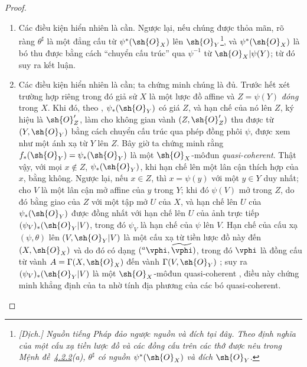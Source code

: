 \documentclass[oneside]{amsart}
\newcommand{\oldpage}[2][]{{\marginnote{\normalfont\textbf{#1}~|~#2}}\ignorespaces}
\begin{document}
\begin{proof}
\medskip\noindent
\begin{enumerate}
  \item[(a)] Các điều kiện hiển nhiên là cần.
    Ngược lại, nếu chúng được thỏa mãn, rõ ràng $\theta^\sharp$ là một đẳng cấu từ $\psi^*(\sh{O}_X)$ lên $\sh{O}_Y$\footnote{\emph{[Dịch.] Nguồn tiếng Pháp đảo ngược nguồn và đích tại đây. Theo định nghĩa của một cấu xạ tiền lược đồ và các đồng cấu trên các thớ được nêu trong Mệnh đề~\hyperref[I.4.2.2]{4.2.2}(a), $\theta^\sharp$ có nguồn $\psi^*(\sh{O}_X)$ và đích $\sh{O}_Y$.}}, và $\psi^*(\sh{O}_X)$ là bó thu được bằng cách ``chuyển cấu trúc'' qua $\psi^{-1}$ từ $\sh{O}_X|\psi(Y)$;
    từ đó suy ra kết luận.

  \item[(b)] Các điều kiện hiển nhiên là cần; ta chứng minh chúng là đủ.
    Trước hết xét trường hợp riêng trong đó giả sử $X$ là một lược đồ affine và $Z=\psi(Y)$ \emph{đóng} trong $X$.
    Khi đó, theo , $\psi_*(\sh{O}_Y)$ có giá $Z$, và hạn chế của nó lên $Z$, ký hiệu là $\sh{O}_Z'$, làm cho không gian vành $(Z,\sh{O}_Z')$ thu được từ $(Y,\sh{O}_Y)$ bằng cách chuyển cấu trúc qua phép đồng phôi $\psi$, được xem như một ánh xạ từ $Y$ lên $Z$.
    Bây giờ ta chứng minh rằng $f_*(\sh{O}_Y)=\psi_*(\sh{O}_Y)$ là một $\sh{O}_X$-môđun \emph{quasi-coherent}.
    Thật vậy, với mọi $x\not\in Z$, $\psi_*(\sh{O}_Y)$, khi hạn chế lên một lân cận thích hợp của $x$, bằng không.
    Ngược lại, nếu $x\in Z$, thì $x=\psi(y)$ với một $y\in Y$ duy nhất;
    cho $V$ là một lân cận mở affine của $y$ trong $Y$;
    khi đó $\psi(V)$ mở trong $Z$, do đó bằng giao của $Z$ với một tập mở $U$ của $X$, và hạn chế lên $U$ của $\psi_*(\sh{O}_Y)$ được đồng nhất với hạn chế lên $U$ của ảnh trực tiếp
\oldpage[I]{123}
    $(\psi_V)_*(\sh{O}_Y|V)$, trong đó $\psi_V$ là hạn chế của $\psi$ lên $V$.
    Hạn chế của cấu xạ $(\psi,\theta)$ lên $(V,\sh{O}_Y|V)$ là một cấu xạ từ tiền lược đồ này đến $(X,\sh{O}_X)$ và do đó có dạng $({}^a\vphi,\widetilde{\vphi})$, trong đó $\vphi$ là đồng cấu từ vành $A=\Gamma(X,\sh{O}_X)$ đến vành $\Gamma(V,\sh{O}_Y)$ ;
    suy ra $(\psi_V)_*(\sh{O}_Y|V)$ là một $\sh{O}_X$-môđun quasi-coherent , điều này chứng minh khẳng định của ta nhờ tính địa phương của các bó quasi-coherent.


\end{enumerate}
\end{proof}
\end{document}

